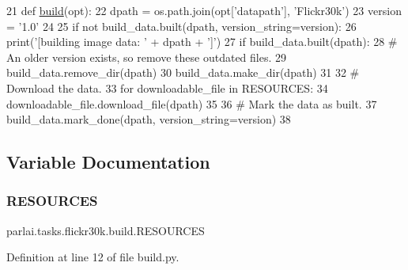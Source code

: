 \begin{DoxyCode}
21 \textcolor{keyword}{def }\hyperlink{namespacedialog__babi__feedback_1_1build_a7a9d289f7493a5ded13c4b7f071b6184}{build}(opt):
22     dpath = os.path.join(opt[\textcolor{stringliteral}{'datapath'}], \textcolor{stringliteral}{'Flickr30k'})
23     version = \textcolor{stringliteral}{'1.0'}
24 
25     \textcolor{keywordflow}{if} \textcolor{keywordflow}{not} build\_data.built(dpath, version\_string=version):
26         print(\textcolor{stringliteral}{'[building image data: '} + dpath + \textcolor{stringliteral}{']'})
27         \textcolor{keywordflow}{if} build\_data.built(dpath):
28             \textcolor{comment}{# An older version exists, so remove these outdated files.}
29             build\_data.remove\_dir(dpath)
30         build\_data.make\_dir(dpath)
31 
32         \textcolor{comment}{# Download the data.}
33         \textcolor{keywordflow}{for} downloadable\_file \textcolor{keywordflow}{in} RESOURCES:
34             downloadable\_file.download\_file(dpath)
35 
36         \textcolor{comment}{# Mark the data as built.}
37         build\_data.mark\_done(dpath, version\_string=version)
38 \end{DoxyCode}


\subsection{Variable Documentation}
\mbox{\label{namespaceparlai_1_1tasks_1_1flickr30k_1_1build_a3231e5ad00e54750b7e231a03b8f7ef9}} 
\subsubsection{\texorpdfstring{R\+E\+S\+O\+U\+R\+C\+ES}{RESOURCES}}
{\footnotesize\ttfamily parlai.\+tasks.\+flickr30k.\+build.\+R\+E\+S\+O\+U\+R\+C\+ES}



Definition at line 12 of file build.\+py.

